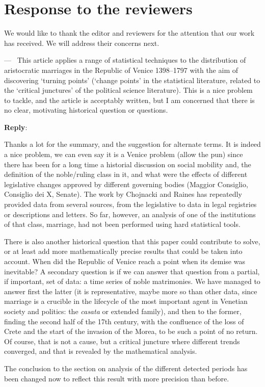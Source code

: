 \documentclass[11pt]{article}
\newcounter{reviewer}
\newcounter{point}[reviewer]
\renewcommand{\thepoint}{P\,\thereviewer.\arabic{point}}
\newenvironment{point}
   {\refstepcounter{point} \bigskip \noindent {\textbf{Reviewer~Point~\thepoint} } ---\ }
   {\par }
\newenvironment{reply}
   {\medskip \noindent \begin{sf}\textbf{Reply}:\  }
   {\medskip \end{sf}}
\begin{document}
\section*{Response to the reviewers}

We would like to thank the editor and reviewers for the attention that our work has received. We will address their concerns next.

\begin{point}
This article applies a range of statistical techniques to the distribution
of aristocratic marriages in the Republic of Venice 1398–1797 with the aim
of discovering ‘turning points’ (‘change points’ in the statistical literature,
related to the ‘critical junctures’ of the political science literature). This
is a nice problem to tackle, and the article is acceptably written, but I am
concerned that there is no clear, motivating historical question or questions.
\end{point}

\begin{reply}

  Thanks a lot for the summary, and the suggestion for alternate terms. It is
  indeed a nice problem, we can even say it is a Venice problem (allow the pun)
  since there has been for a long time a historial discussion on social mobility
  and, the definition of the noble/ruling class in it, and what were the effects
  of different legislative changes approved by different governing bodies
  (Maggior Consiglio, Consiglio dei X, Senate). The work by Chojnacki
  \cite{10.2307/202860,second:serrata,chojnacki00} and Raines
  \cite{raines2013rameau,raines2003cooptazione} has repeatedly provided data
  from several sources, from the legislative to data in legal registries or
  descriptions and letters. So far, however, an analysis of one of the
  institutions of that class, marriage, had not been performed using hard
  statistical tools.

  There is also another historical question that this paper could contribute to
  solve, or at least add more mathematically precise results that could be taken
  into account. When did the Republic of Venice reach a point when its demise
  was inevitable? A secondary question is if we can answer that question from a
  partial, if important, set of data: a time series of noble matrimonies. We
  have managed to answer first the latter (it is representative, maybe more so
  than other data, since marriage is a crucible in the lifecycle of the most
  important agent in Venetian society and politics: the {\em casata} or extended
  family), and then to the former, finding the second half of the 17th century,
  with the confluence of the loss of Crete and the start of the invasion of the
  Morea, to be such a point of no return. Of course, that is not a cause, but a
  critical juncture where different trends converged, and that is revealed by
  the mathematical analysis.

  The conclusion to the section on analysis of the different detected periods
  has been changed now to reflect this result with more precision than before.
\end{reply}
\end{document}
